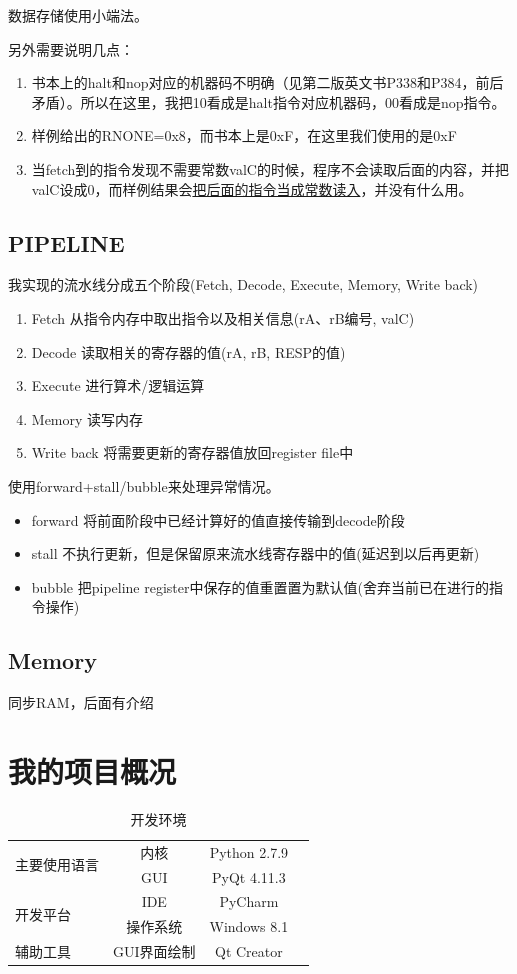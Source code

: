 \documentclass{article}
\begin{document}
数据存储使用小端法。\cite{3}

另外需要说明几点：
\begin{enumerate}
\item 书本上的halt和nop对应的机器码不明确（见第二版英文书P338和P384，前后矛盾）。所以在这里，我把10看成是halt指令对应机器码，00看成是nop指令。
\item 样例给出的RNONE=0x8，而书本上是0xF，在这里我们使用的是0xF
\item 当fetch到的指令发现不需要常数valC的时候，程序不会读取后面的内容，并把valC设成0，而样例结果会\underline{把后面的指令当成常数读入}，并没有什么用。
\end{enumerate}
\subsection{PIPELINE}
我实现的流水线分成五个阶段(Fetch, Decode, Execute, Memory, Write back)
\begin{enumerate}
\item Fetch      从指令内存中取出指令以及相关信息(rA、rB编号, valC)
\item Decode     读取相关的寄存器的值(rA, rB, RESP的值)
\item Execute    进行算术/逻辑运算
\item Memory     读写内存
\item Write back 将需要更新的寄存器值放回register file中
\end{enumerate}

使用forward+stall/bubble来处理异常情况。
\begin{itemize}
\item forward 将前面阶段中已经计算好的值直接传输到decode阶段
\item stall 不执行更新，但是保留原来流水线寄存器中的值(延迟到以后再更新)
\item bubble 把pipeline register中保存的值重置置为默认值(舍弃当前已在进行的指令操作)
\end{itemize}
\subsection{Memory}
同步RAM，后面有介绍
\section{我的项目概况}
\begin{center}
\begin{table}[!ht]     %
\centering
\caption{开发环境}
\begin{tabular}{|l|c|c|c|}
\hline
\multirow{2}{*}{主要使用语言} & 内核 & Python 2.7.9\\
\cline{2-3}
 & GUI & PyQt 4.11.3\\
\hline
\multirow{2}{*}{开发平台} & IDE & PyCharm\\
\cline{2-3}
& 操作系统 & Windows 8.1\\
\hline
辅助工具 & GUI界面绘制 & Qt Creator\\
\hline
\end{tabular}
\end{table}
\end{center}
\end{document}
